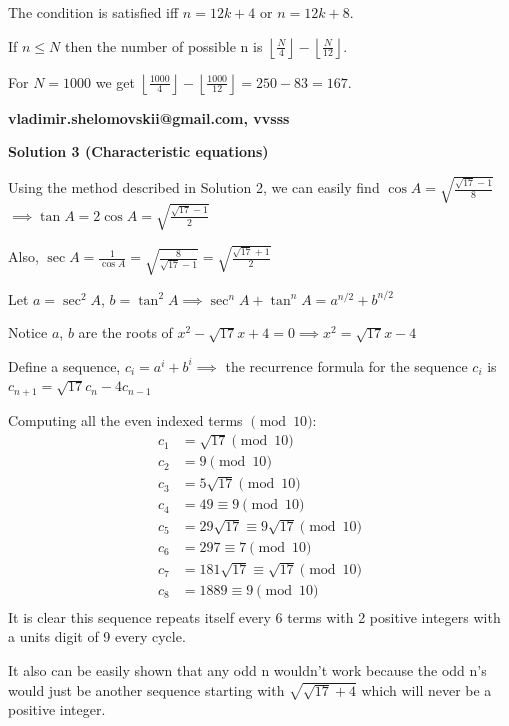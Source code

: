 \begin{enumerate}
 The condition is satisfied iff $n = 12 k + 4$ or $n = 12k + 8.$

 If $n \le N$ then the number of possible n is $\left\lfloor \frac{N}{4} \right\rfloor - \left\lfloor \frac{N}{12} \right\rfloor.$

 For $N = 1000$ we get $\left\lfloor \frac{1000}{4} \right\rfloor - \left\lfloor \frac{1000}{12} \right\rfloor = 250 - 83 = \boxed{167}.$

 \textbf{vladimir.shelomovskii@gmail.com, vvsss}

 



\textbf{Solution 3 (Characteristic equations)}

Using the method described in Solution 2, we can easily find $\cos A = \sqrt{\frac{\sqrt {17} - 1}{8}}$$\implies \tan A = 2\cos A = \sqrt{\frac{\sqrt{17} - 1}{2}}$

 Also, $\sec A = \frac{1}{\cos A} = \sqrt{\frac{8}{\sqrt {17} - 1}} = \sqrt{\frac{\sqrt{17} + 1}{2}}$

 Let $a = \sec^2A$, $b = \tan^2A \implies \sec^nA + \tan^nA = a^{n/2} + b^{n/2}$ 

 Notice $a$, $b$ are the roots of $x^2 - \sqrt {17}x + 4 = 0 \implies$$x^2 = \sqrt {17}x - 4$

 Define a sequence, $c_i = a^i + b^i \implies$ the recurrence formula for the sequence $c_i$ is $c_{n+1} = \sqrt{17}c_n - 4c_{n-1}$

 Computing all the even indexed terms $\pmod{10}$:\begin{align*}c_1 &= \sqrt{17} \pmod{10} \\c_2 &= 9 \pmod{10} \\c_3 &= 5\sqrt{17} \pmod{10} \\c_4 &= 49 \equiv 9 \pmod{10} \\c_{5} &= 29\sqrt{17} \equiv 9\sqrt{17} \pmod{10} \\c_{6} &= 297 \equiv 7 \pmod{10} \\c_{7} &= 181\sqrt{17} \equiv \sqrt{17} \pmod{10} \\c_{8} &= 1889 \equiv 9 \pmod{10} \\\end{align*}
It is clear this sequence repeats itself every 6 terms with 2 positive integers with a units digit of 9 every cycle.

 It also can be easily shown that any odd n wouldn't work because the odd n's would just be another sequence starting with $\sqrt{\sqrt{17} + 4}$ which will never be a positive integer.


\end{enumerate}
